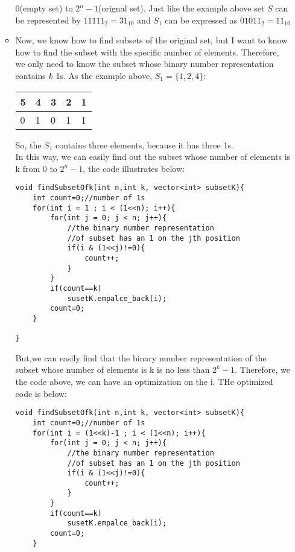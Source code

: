 \begin{enumerate}
\begin{itemize}
            0(empty set) to $2^n-1$(orignal set). Just like the example above set $S$ can be represented by $11111_2 = 31_{10}$ and $S_1$ can be expressed 
            as $01011_2 = 11_{10}$
            \item Now, we know how to find subsets of the original set, but I want to know how to find the subset with the specific number of elements. 
            Therefore, we only need to know the subset whose binary number representation contains $k$ 1s. As the example above, $S_1=\{1,2,4\}$:
            \begin{table}[H]
            \centering
            \begin{tabular}{lllll}
            \hline
            \multicolumn{1}{|l|}{5} & \multicolumn{1}{l|}{4} & \multicolumn{1}{l|}{3} & \multicolumn{1}{l|}{2} & \multicolumn{1}{l|}{1} \\ \hline
            0                       & 1                      & 0                      & 1                      & 1                     
            \end{tabular}
            \end{table}
            So, the $S_1$ contains three elements, because it has three 1s.\\
            In this way, we can easily find out the subset whose number of elements is k from $0$ to $2^n-1$, the code illustrates below:
\begin{lstlisting}
void findSubsetOfk(int n,int k, vector<int> subsetK){
    int count=0;//number of 1s
    for(int i = 1 ; i < (1<<n); i++){
        for(int j = 0; j < n; j++){
            //the binary number representation 
            //of subset has an 1 on the jth position
            if(i & (1<<j)!=0){
                count++;
            }
        }
        if(count==k)
            susetK.empalce_back(i);
        count=0;
    }

}
\end{lstlisting}
        But,we can easily find that the binary number representation of the subset whose number of elements is k is 
        no less than $2^k-1$. Therefore, we the code above, we can have an optimization on the i. THe optimized code is 
        below:\\
\begin{lstlisting}
void findSubsetOfk(int n,int k, vector<int> subsetK){
    int count=0;//number of 1s
    for(int i = (1<<k)-1 ; i < (1<<n); i++){
        for(int j = 0; j < n; j++){
            //the binary number representation 
            //of subset has an 1 on the jth position
            if(i & (1<<j)!=0){
                count++;
            }
        }
        if(count==k)
            susetK.empalce_back(i);
        count=0;
    }


\end{lstlisting}
\end{itemize}
\end{enumerate}
